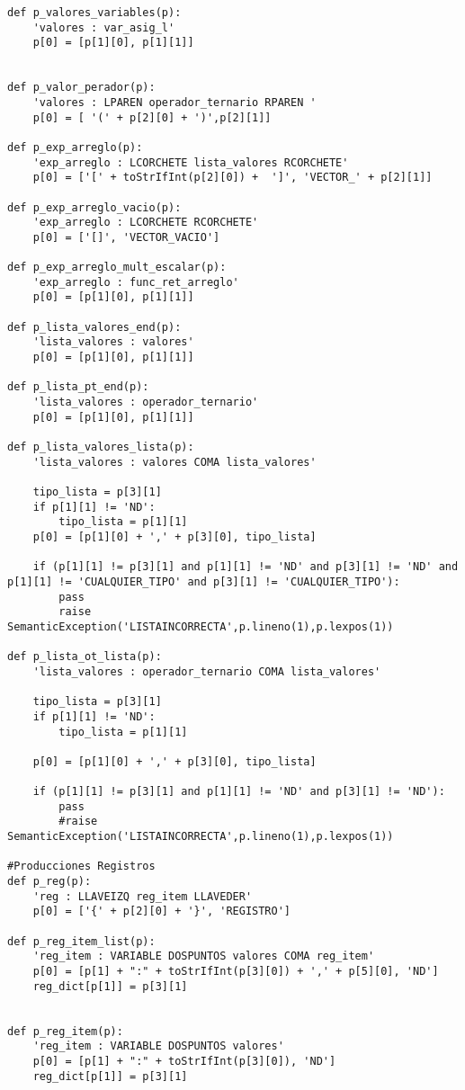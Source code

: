 \begin{verbatim}
def p_valores_variables(p):
    'valores : var_asig_l'
    p[0] = [p[1][0], p[1][1]]


def p_valor_perador(p):
    'valores : LPAREN operador_ternario RPAREN '
    p[0] = [ '(' + p[2][0] + ')',p[2][1]]

def p_exp_arreglo(p):
    'exp_arreglo : LCORCHETE lista_valores RCORCHETE'
    p[0] = ['[' + toStrIfInt(p[2][0]) +  ']', 'VECTOR_' + p[2][1]]

def p_exp_arreglo_vacio(p):
    'exp_arreglo : LCORCHETE RCORCHETE'
    p[0] = ['[]', 'VECTOR_VACIO']

def p_exp_arreglo_mult_escalar(p):
    'exp_arreglo : func_ret_arreglo'
    p[0] = [p[1][0], p[1][1]]

def p_lista_valores_end(p):
    'lista_valores : valores'
    p[0] = [p[1][0], p[1][1]]

def p_lista_pt_end(p):
    'lista_valores : operador_ternario'
    p[0] = [p[1][0], p[1][1]]

def p_lista_valores_lista(p):
    'lista_valores : valores COMA lista_valores'

    tipo_lista = p[3][1]
    if p[1][1] != 'ND':
    	tipo_lista = p[1][1]
    p[0] = [p[1][0] + ',' + p[3][0], tipo_lista]

    if (p[1][1] != p[3][1] and p[1][1] != 'ND' and p[3][1] != 'ND' and p[1][1] != 'CUALQUIER_TIPO' and p[3][1] != 'CUALQUIER_TIPO'):
        pass
        raise SemanticException('LISTAINCORRECTA',p.lineno(1),p.lexpos(1))

def p_lista_ot_lista(p):
    'lista_valores : operador_ternario COMA lista_valores'

    tipo_lista = p[3][1]
    if p[1][1] != 'ND':
    	tipo_lista = p[1][1]

    p[0] = [p[1][0] + ',' + p[3][0], tipo_lista]

    if (p[1][1] != p[3][1] and p[1][1] != 'ND' and p[3][1] != 'ND'):
        pass
        #raise SemanticException('LISTAINCORRECTA',p.lineno(1),p.lexpos(1))
        
#Producciones Registros
def p_reg(p):
    'reg : LLAVEIZQ reg_item LLAVEDER'
    p[0] = ['{' + p[2][0] + '}', 'REGISTRO']

def p_reg_item_list(p):
    'reg_item : VARIABLE DOSPUNTOS valores COMA reg_item' 
    p[0] = [p[1] + ":" + toStrIfInt(p[3][0]) + ',' + p[5][0], 'ND']
    reg_dict[p[1]] = p[3][1]
    

def p_reg_item(p):
    'reg_item : VARIABLE DOSPUNTOS valores' 
    p[0] = [p[1] + ":" + toStrIfInt(p[3][0]), 'ND']
    reg_dict[p[1]] = p[3][1]



\end{verbatim}
